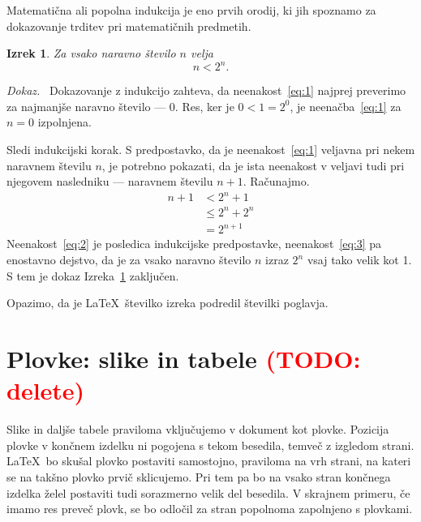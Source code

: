 \documentclass[a4paper, 12pt]{book}
\newcommand{\TODO}[1]{\textcolor{red}{(TODO: #1)}}
\newtheorem{izrek}{Izrek}[chapter]
\newenvironment{dokaz}{\emph{Dokaz.}\ }{\hspace{\fill}{$\Box$}}
\begin{document}
\label{ch1}
Matematična ali popolna indukcija je eno prvih orodij, ki jih spoznamo za dokazovanje trditev pri matematičnih predmetih. 
\begin{izrek}
\label{iz:1}
Za vsako naravno število $n$ velja
\begin{equation}
n < 2^n.
\label{eq:1}
\end{equation}
\end{izrek}
\begin{dokaz}
Dokazovanje z indukcijo zahteva, da neenakost~\eqref{eq:1} najprej preverimo
za najmanjše naravno število --- $0$. Res, ker je $0 < 1 = 2^0$, je
neenačba~\eqref{eq:1} za $n=0$ izpolnjena.

Sledi indukcijski korak. S predpostavko, da je neenakost~\eqref{eq:1} veljavna
pri nekem naravnem številu $n$, je potrebno pokazati, da je ista neenakost v
veljavi tudi pri njegovem nasledniku --- naravnem številu $n+1$. Računajmo.
\begin{align}
n+1 &< 2^n + 1  \label{eq:2}\\
    &\le 2^n + 2^n \label{eq:3}\\
    &= 2^{n+1} \nonumber
\end{align} 
Neenakost~\eqref{eq:2} je posledica indukcijske predpostavke,
neenakost~\eqref{eq:3} pa enostavno dejstvo, da je za vsako naravno število $n$
izraz $2^n$ vsaj tako velik kot 1. S tem je dokaz Izreka~\ref{iz:1} zaključen.
\end{dokaz}

Opazimo, da je \LaTeX\ številko izreka podredil številki poglavja.



\chapter*{Plovke: slike in tabele \TODO{delete}}
\label{ch2}
Slike in daljše tabele praviloma vključujemo v dokument kot plovke. Pozicija plovke v končnem izdelku ni pogojena s tekom besedila, temveč z izgledom strani. \LaTeX\ bo skušal plovko postaviti samostojno, praviloma na vrh strani, na kateri se na takšno plovko prvič sklicujemo. Pri tem pa bo na vsako stran končnega izdelka želel postaviti tudi sorazmerno velik del besedila. V skrajnem primeru, če imamo res preveč plovk, se bo odločil za stran popolnoma zapolnjeno s plovkami.
\end{document}

